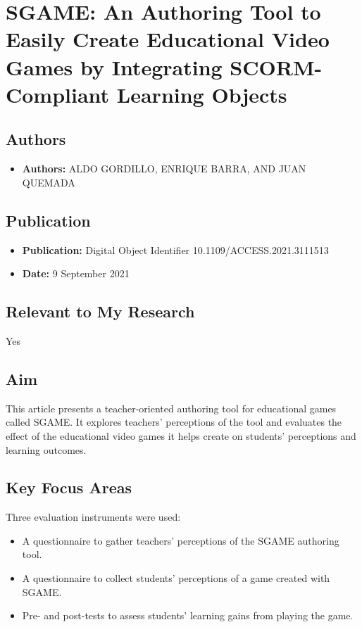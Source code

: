 \section{SGAME: An Authoring Tool to Easily Create Educational Video Games by Integrating SCORM-Compliant Learning Objects}

\subsection{Authors}
\begin{itemize}
    \item \textbf{Authors:} ALDO GORDILLO, ENRIQUE BARRA, AND JUAN QUEMADA 
\end{itemize}

\subsection{Publication}
\begin{itemize}
    \item \textbf{Publication:} Digital Object Identifier 10.1109/ACCESS.2021.3111513
    \item \textbf{Date:} 9 September 2021
\end{itemize}

\subsection{Relevant to My Research}
Yes

\subsection{Aim}
This article presents a teacher-oriented authoring tool for educational games called SGAME. It explores teachers' perceptions of the tool and evaluates the effect of the educational video games it helps create on students' perceptions and learning outcomes.

\subsection{Key Focus Areas}
Three evaluation instruments were used:
\begin{itemize}
    \item A questionnaire to gather teachers' perceptions of the SGAME authoring tool.
    \item A questionnaire to collect students' perceptions of a game created with SGAME.
    \item Pre- and post-tests to assess students' learning gains from playing the game.
\end{itemize}

